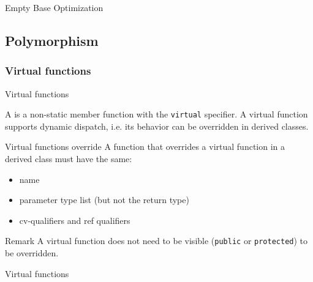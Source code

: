 \begin{frame}{Empty Base Optimization}{}
  \begin{example}
  \end{example}
\end{frame}


\subsection{Polymorphism}

\subsubsection{Virtual functions}

\begin{frame}{Virtual functions}{}
  \begin{definition}
    A  is a non-static member function with the \lstinline!virtual! specifier. A virtual function supports dynamic dispatch, i.e. its behavior can be overridden in derived classes.
  \end{definition}

  \begin{block}{Virtual functions override}
    A function that overrides a virtual function in a derived class must have the same:
    \begin{itemize}
    \item
      name
    \item
      parameter type list (but not the return type)
    \item
      cv-qualifiers and ref qualifiers
    \end{itemize}
  \end{block}

  \begin{block}{Remark}
    A virtual function does not need to be visible (\lstinline!public! or \lstinline!protected!) to be overridden.
  \end{block}
\end{frame}

\begin{frame}{Virtual functions}{}
  \begin{example}
  \end{example}
\end{frame}

